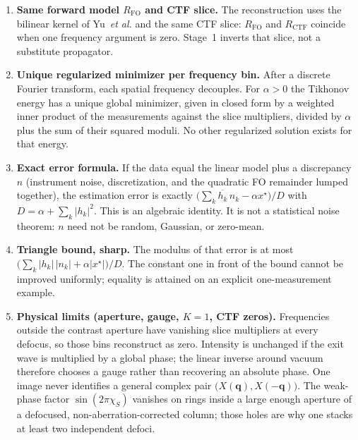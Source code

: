 \begin{enumerate}
\item
  \textbf{Same forward model $R_{\mathrm{FO}}$ and CTF slice.}
  The reconstruction uses the bilinear kernel of Yu~\emph{et al.}
  and the same CTF slice: $R_{\mathrm{FO}}$ and $R_{\mathrm{CTF}}$
  coincide when one frequency argument is zero.
  Stage~1 inverts that slice, not a substitute propagator.

\item
  \textbf{Unique regularized minimizer per frequency bin.}
  After a discrete Fourier transform, each spatial frequency decouples.
  For $\alpha>0$ the Tikhonov energy has a unique global minimizer,
  given in closed form by a weighted inner product of the measurements
  against the slice multipliers, divided by $\alpha$ plus the sum of
  their squared moduli.
  No other regularized solution exists for that energy.

\item
  \textbf{Exact error formula.}
  If the data equal the linear model plus a discrepancy $n$
  (instrument noise, discretization, and the quadratic FO remainder
  lumped together), the estimation error is exactly
  $\bigl(\sum_k \overline{h_k}\,n_k-\alpha x^\star\bigr)/D$ with
  $D=\alpha+\sum_k\lvert h_k\rvert^2$.
  This is an algebraic identity.
  It is not a statistical noise theorem: $n$ need not be random,
  Gaussian, or zero-mean.

\item
  \textbf{Triangle bound, sharp.}
  The modulus of that error is at most
  $\bigl(\sum_k \lvert h_k\rvert\,\lvert n_k\rvert
  +\alpha\lvert x^\star\rvert\bigr)/D$.
  The constant one in front of the bound cannot be improved uniformly;
  equality is attained on an explicit one-measurement example.

\item
  \textbf{Physical limits (aperture, gauge, $K=1$, CTF zeros).}
  Frequencies outside the contrast aperture have vanishing slice
  multipliers at every defocus, so those bins reconstruct as zero.
  Intensity is unchanged if the exit wave is multiplied by a global
  phase; the linear inverse around vacuum therefore chooses a gauge
  rather than recovering an absolute phase.
  One image never identifies a general complex pair
  $\bigl(X(\mathbf{q}),X(-\mathbf{q})\bigr)$.
  The weak-phase factor $\sin(2\pi\chi_S)$ vanishes on rings inside a
  large enough aperture of a defocused, non-aberration-corrected
  column; those holes are why one stacks at least two independent
  defoci.


\end{enumerate}
